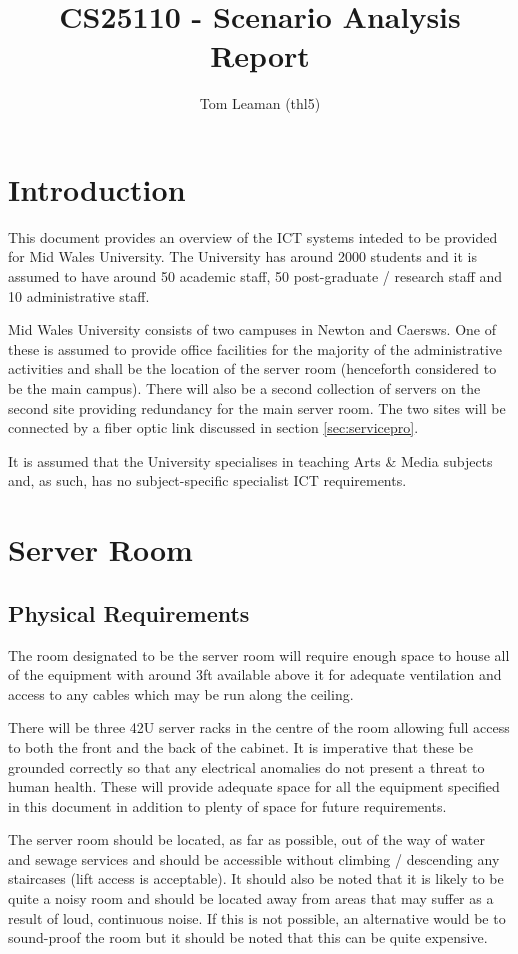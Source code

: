 \documentclass[a4paper, twoside]{article}
\title{CS25110 - Scenario Analysis Report}
\author{Tom Leaman (thl5)}
\begin{document}
\maketitle
\newpage
\tableofcontents
\newpage

\section{Introduction}
This document provides an overview of the ICT systems inteded to be provided for
Mid Wales University. The University has around 2000 students and it is assumed
to have around 50 academic staff, 50 post-graduate / research staff and 10
administrative staff.

Mid Wales University consists of two campuses in Newton and Caersws. One of
these is assumed to provide office facilities for the majority of the
administrative activities and shall be the location of the server room
(henceforth considered to be the main campus). There will also be a second
collection of servers on the second site providing redundancy for the main
server room. The two sites will be connected by a fiber optic link discussed in
section \ref{sec:servicepro}.

It is assumed that the University specialises in teaching Arts \& Media subjects
and, as such, has no subject-specific specialist ICT requirements.

\section{Server Room}
\subsection{Physical Requirements}
The room designated to be the server room will require enough space to house all
of the equipment with around 3ft available above it for adequate ventilation
and access to any cables which may be run along the ceiling.

There will be three 42U server racks in the centre of the room allowing full access
to both the front and the back of the cabinet. It is imperative that these be
grounded correctly so that any electrical anomalies do not present a threat to
human health. These will provide adequate space for all the equipment specified
in this document in addition to plenty of space for future requirements.

The server room should be located, as far as possible, out of the way of water
and sewage services and should be accessible without climbing / descending any
staircases (lift access is acceptable). It should also be noted that it is
likely to be quite a noisy room and should be located away from areas that may
suffer as a result of loud, continuous noise. If this is not possible, an
alternative would be to sound-proof the room but it should be noted that this
can be quite expensive.
\end{document}
